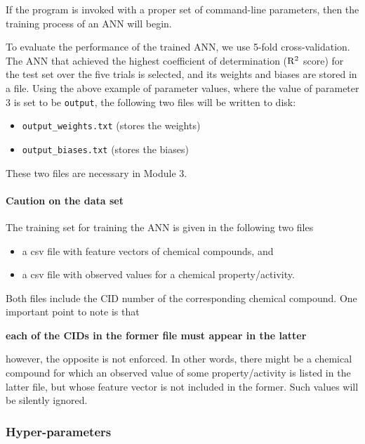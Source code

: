 \documentclass[11pt,titlepage,dvipdfmx,twoside]{book}
\begin{document}
If the program is invoked with a proper set of command-line parameters,
then the training process of an ANN will begin.

To evaluate the performance of the trained ANN,
we use 5-fold cross-validation.
The ANN that achieved the highest coefficient of determination 
(${\rm R}^2$ score) for the test set over the five trials
is selected, and its weights and biases are stored
in a file.
Using the above example of parameter values,
where the value of parameter 3 is set to be \verb|output|,
the following two files will be written to disk:
\begin{itemize}
\item \verb|output_weights.txt| (stores the weights)
\item \verb|output_biases.txt| (stores the biases)
\end{itemize}
These two files are necessary in Module 3.


\paragraph{Caution on the data set}
The training set for training the ANN is given 
in the following two files
%
\begin{itemize}
\item a csv file with feature vectors of chemical compounds, and 
\item a csv file with observed values for a chemical property/activity.
\end{itemize}
Both files include the CID number of the corresponding chemical compound.
One important point to note is that
%
\begin{center}
  {\bf each of the CIDs in the former file must appear in the latter }
\end{center}
%
however, the opposite is not enforced.
In other words, there might be a chemical compound
for which an observed value of some property/activity
is listed in the latter file, but whose
feature vector is not included in the former.
Such values will be silently ignored.


\subsubsection{Hyper-parameters}
\end{document}
